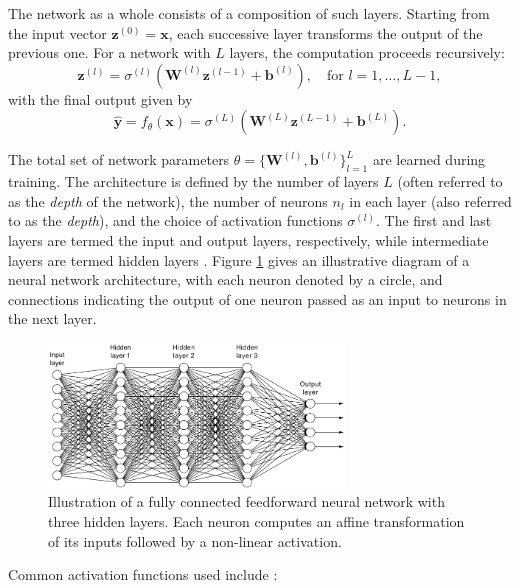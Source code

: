 The network as a whole consists of a composition of such layers. Starting from the input 
vector \( \mathbf{z}^{(0)} = \mathbf{x} \), each successive layer transforms the output of the previous
one. For a network with \( L \) layers, the computation proceeds recursively:
\[
    \mathbf{z}^{(l)} = \sigma^{(l)}\left( \mathbf{W}^{(l)} \mathbf{z}^{(l-1)} + \mathbf{b}^{(l)} 
    \right), \quad \text{for } l = 1, \dots, L-1,
\]
with the final output given by
\[
    \hat{\mathbf{y}} = f_\theta(\mathbf{x}) = \sigma^{(L)}(\mathbf{W}^{(L)} \mathbf{z}^{(L-1)} + 
    \mathbf{b}^{(L)}).
\]

The total set of network parameters \( \theta = \{ \mathbf{W}^{(l)}, \mathbf{b}^{(l)} \}_{l=1}^L \) 
are learned during training. The architecture is defined by the number of layers \( L \) (often 
referred to as the \textit{depth} of the network), the number 
of neurons \( n_l \) in each layer (also referred to as the \textit{depth}), and the choice of 
activation functions \( \sigma^{(l)} \). The first and last layers are termed the input and output 
layers, respectively, while intermediate 
layers are termed hidden layers \cite{goodfellow2016deep}. 
Figure \ref{fig:nn-architecture} gives an illustrative diagram of 
a neural network architecture, with each neuron denoted by a circle, and connections indicating the
output of one neuron passed as an input to neurons in the next layer.

\begin{figure}[h]
    \centering
    \includegraphics[width=0.7\textwidth]{graphics/neural_network_image.png}
    \caption{Illustration of a fully connected feedforward neural network with three hidden layers. 
    Each neuron computes an affine transformation of its inputs followed by a non-linear activation.}
    \label{fig:nn-architecture}
\end{figure}


Common activation functions used include \cite{goodfellow2016deep}:

